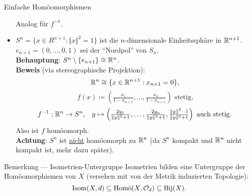 \begin{example}{Einfache Homöomorphismen}
\begin{itemize}
        Analog für $ f^{-1} $.
    \item $ S^n = \{ x \in R^{n+1} : \Vert x \Vert^2 = 1 \} $ ist die $ n $-dimensionale Einheitssphäre in $ \mathbb{R}^{n+1} $. \\
      $ e_{n+1} = (0,\dots,0,1) $ sei der ``Nordpol'' von $ S_n $. \\
      \textbf{Behauptung}: $ S^n\setminus\{ e_{n+1} \} \cong \mathbb{R}^n $. \\
      \textbf{Beweis} (via stereographische Projektion):
      \begin{equation*}
        \mathbb{R}^n \cong \{ x \in \mathbb{R}^{n+1} : x_{n+1} = 0 \}\text{,}
      \end{equation*}
      \begin{equation*}
        f(x) \coloneqq (\tfrac{x_1}{1-x_{n+1}}, \dots, \tfrac{x_n}{1-x_{n+1}}) \text{ stetig,}
      \end{equation*}
      \begin{equation*}
        f^{-1}: \mathbb{R}^n \to S^n\text{,} \quad y \mapsto \left( \tfrac{2y_1}{\Vert y \Vert^2+1}, \dots, \tfrac{2y_n}{\Vert y \Vert^2+1}, \tfrac{\Vert y \Vert^2-1}{\Vert y \Vert^2+1} \right)\text{ auch stetig.}
      \end{equation*}
      Also ist $ f $ homöomorph. \\
      \textbf{Achtung}: $ S^n $ ist \underline{nicht} homöomorph zu $ \mathbb{R}^n $ (da $ S^n $ kompakt und $ \mathbb{R}^n $ nicht kompakt ist, mehr dazu später).
  \end{itemize}
\end{example}

\begin{remark}{Bemerkung --- Isometrien-Untergruppe}
  Isometrien bilden eine Untergruppe der Homöomorphismen von $ X $ (versehen mit von der Metrik induzierten Topologie):
  \begin{equation*}
    \text{Isom}(X, d) \subseteq \text{Homö}(X, \mathcal{O}_d) \subseteq \text{Bij}(X)\text{.}
  \end{equation*}
\end{remark}

